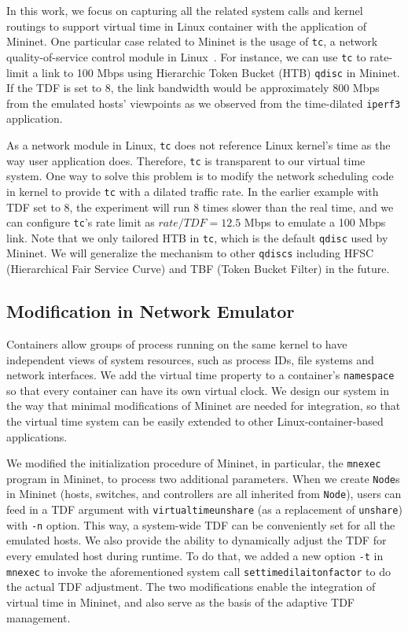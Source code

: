 In this work, we focus on capturing all the related system calls and kernel routings to support virtual time in Linux container with the application of Mininet. 
One particular case related to Mininet is the usage of \texttt{tc}, a network quality-of-service control module in Linux~\cite{TrafficControl}. 
For instance, we can use \texttt{tc} to rate-limit a link to 100 Mbps using Hierarchic Token Bucket (HTB) \texttt{qdisc} in Mininet. If the TDF is set to 8, the link bandwidth would be approximately 800 Mbps from the emulated hosts' viewpoints as we observed from the time-dilated \texttt{iperf3} application.

As a network module in Linux, \texttt{tc} does not reference Linux kernel's time as the way user application does. 
Therefore, \texttt{tc} is transparent to our virtual time system. One way to solve this problem is to modify the network scheduling code in kernel to provide \texttt{tc} with a dilated traffic rate. 
In the earlier example with TDF set to 8, the experiment will run 8 times slower than the real time, and we can configure \texttt{tc}'s rate limit as $rate/TDF=12.5$ Mbps to emulate a 100 Mbps link. 
Note that we only tailored HTB in \texttt{tc}, which is the default \texttt{qdisc} used by Mininet. 
We will generalize the mechanism to other \texttt{qdiscs} including HFSC (Hierarchical Fair Service Curve) and TBF (Token Bucket Filter) in the future.

\subsection{Modification in Network Emulator}
\label{VT:SubSec:ImplementMininet}
Containers allow groups of process running on the same kernel to have independent views of system resources, such as process IDs, file systems and network interfaces. 
We add the virtual time property to a container's \texttt{namespace}~\cite{LinuxNamespace} so that every container can have its own virtual clock. 
We design our system in the way that minimal modifications of Mininet are needed for integration, so that the virtual time system can be easily extended to other Linux-container-based applications. 

We modified the initialization procedure of Mininet, in particular, the \texttt{mnexec} program in Mininet, to process two additional parameters. 
When we create \texttt{Node}s in Mininet (hosts, switches, and controllers are all inherited from \texttt{Node}), users can feed in a TDF argument with \texttt{virtualtimeunshare} (as a replacement of \texttt{unshare}) with \texttt{-n} option. 
This way, a system-wide TDF can be conveniently set for all the emulated hosts. We also provide the ability to dynamically adjust the TDF for every emulated host during runtime. 
To do that, we added a new option \texttt{-t} in \texttt{mnexec} to invoke the aforementioned system call \texttt{settimedilaitonfactor} to do the actual TDF adjustment. 
The two modifications enable the integration of virtual time in Mininet, and also serve as the basis of the adaptive TDF management.

